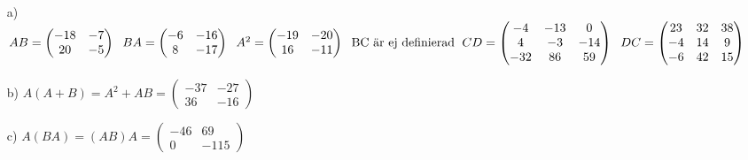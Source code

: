 \begin{enumerate}
    \item[a)]
        \begin{math}
            AB=\begin{pmatrix}
                -18 & -7\\
                20 & -5
            \end{pmatrix}
            \hspace{6px}
            BA=\begin{pmatrix}
                -6 & -16\\
                8 & -17
            \end{pmatrix}
            \hspace{6px}
            A^2=\begin{pmatrix}
                -19 & -20\\
                16 & -11
            \end{pmatrix}
            \hspace{6px}
            \text{BC är ej definierad}
            \hspace{6px}
            CD=\begin{pmatrix}
                -4 & -13 & 0\\
                4 & -3 & -14\\
                -32 & 86 & 59
            \end{pmatrix}
            \hspace{6px}
            DC=\begin{pmatrix}
                23 & 32 & 38\\
                -4 & 14 & 9\\
                -6 & 42 & 15
            \end{pmatrix}
        \end{math}
    \item[b)]
        \begin{math}
            A(A+B)=A^2+AB=\begin{pmatrix}
                -37 & -27\\
                36 & -16
            \end{pmatrix}
        \end{math}
    \item[c)]
        \begin{math}
            A(BA)=(AB)A=\begin{pmatrix}
                -46 & 69\\
                0 & -115
            \end{pmatrix}
        \end{math}
\end{enumerate}
